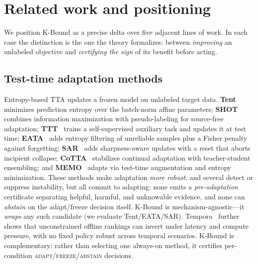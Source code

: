 \documentclass[conference]{IEEEtran}
\theoremstyle{plain}
\theoremstyle{definition}
\begin{document}
\section{Related work and positioning}
We position K-Bound as a precise delta over five adjacent lines of work. In each case the
distinction is the one the theory formalizes: between \emph{improving} an unlabeled objective
and \emph{certifying the sign} of its benefit before acting.

\subsection{Test-time adaptation methods}
Entropy-based TTA updates a frozen model on unlabeled target data. \textbf{Tent}~\cite{wang2021tent} minimizes
prediction entropy over the batch-norm affine parameters; \textbf{SHOT}~\cite{liang2020shot} combines information
maximization with pseudo-labeling for source-free adaptation; \textbf{TTT}~\cite{sun2020ttt} trains a
self-supervised auxiliary task and updates it at test time; \textbf{EATA}~\cite{niu2022eata} adds entropy
filtering of unreliable samples plus a Fisher penalty against forgetting; \textbf{SAR}~\cite{niu2023sar}
adds sharpness-aware updates with a reset that aborts incipient collapse; \textbf{CoTTA}~\cite{wang2022cotta}
stabilizes continual adaptation with teacher-student ensembling; and \textbf{MEMO}~\cite{zhang2022memo}
adapts via test-time augmentation and entropy minimization. These methods make
adaptation \emph{more robust}, and several detect or suppress instability, but all commit to
adapting: none emits a \emph{pre-adaptation} certificate separating helpful, harmful, and
unknowable evidence, and none can \emph{abstain} on the adapt/freeze decision itself. K-Bound
is mechanism-agnostic---it \emph{wraps} any such candidate (we evaluate Tent/EATA/SAR).
Tempora~\cite{tempora2026} further shows that unconstrained offline rankings can invert under
latency and compute pressure, with no fixed policy robust across temporal scenarios. K-Bound is
complementary: rather than selecting one always-on method, it certifies per-condition
\textsc{adapt}/\textsc{freeze}/\textsc{abstain} decisions.
\end{document}
